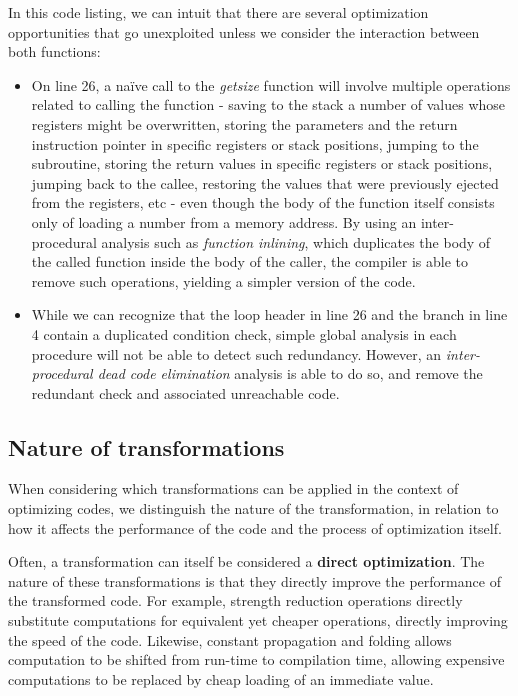 In this code listing, we can intuit that there are several optimization opportunities that go unexploited unless we consider the interaction between both functions:

\begin{itemize}
    \item On line 26, a naïve call to the \textit{get\textunderscore{}size} function will involve multiple operations related to calling the function - saving to the stack a number of values whose registers might be overwritten, storing the parameters and the return instruction pointer in specific registers or stack positions, jumping to the subroutine, storing the return values in specific registers or stack positions, jumping back to the callee, restoring the values that were previously ejected from the registers, etc - even though the body of the function itself consists only of loading a number from a memory address. By using an inter-procedural analysis such as \textit{function inlining}, which duplicates the body of the called function inside the body of the caller, the compiler is able to remove such operations, yielding a simpler version of the code.
    \item While we can recognize that the loop header in line 26 and the branch in line 4 contain a duplicated condition check, simple global analysis in each procedure will not be able to detect such redundancy. However, an \textit{inter-procedural dead code elimination} analysis is able to do so, and remove the redundant check and associated unreachable code.
\end{itemize}

\subsection{Nature of transformations}

When considering which transformations can be applied in the context of optimizing codes, we distinguish the nature of the transformation, in relation to how it affects the performance of the code and the process of optimization itself.

Often, a transformation can itself be considered a \textbf{direct optimization}. The nature of these transformations is that they directly improve the performance of the transformed code. For example, strength reduction operations directly substitute computations for equivalent yet cheaper operations, directly improving the speed of the code. Likewise, constant propagation and folding allows computation to be shifted from run-time to compilation time, allowing expensive computations to be replaced by cheap loading of an immediate value.

